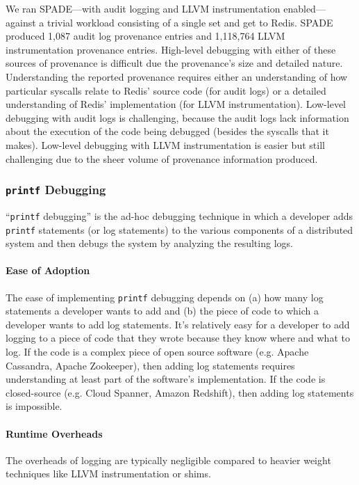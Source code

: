 We ran SPADE---with audit logging and LLVM instrumentation enabled---against a
trivial workload consisting of a single set and get to Redis. SPADE produced
1,087 audit log provenance entries and 1,118,764 LLVM instrumentation
provenance entries. High-level debugging with either of these sources of
provenance is difficult due the provenance's size and detailed nature.
Understanding the reported provenance requires either an understanding of how
particular syscalls relate to Redis' source code (for audit logs) or a detailed
understanding of Redis' implementation (for LLVM instrumentation). Low-level
debugging with audit logs is challenging, because the audit logs lack
information about the execution of the code being debugged (besides the
syscalls that it makes). Low-level debugging with LLVM instrumentation is easier
but still challenging due to the sheer volume of provenance information
produced.

\newcommand{\printf}{\texttt{printf}}
\subsubsection{\printf{} Debugging}
``\printf{} debugging'' is the ad-hoc debugging technique in which a developer
adds \printf{} statements (or log statements) to the various components of a
distributed system and then debugs the system by analyzing the resulting logs.

\paragraph{Ease of Adoption}
The ease of implementing \printf{} debugging depends on (a) how many log
statements a developer wants to add and (b) the piece of code to which a
developer wants to add log statements. It's relatively easy for a developer to
add logging to a piece of code that they wrote because they know where and what
to log. If the code is a complex piece of open source software (e.g. Apache
Cassandra, Apache Zookeeper), then adding log statements requires understanding
at least part of the software's implementation. If the code is closed-source
(e.g. Cloud Spanner, Amazon Redshift), then adding log statements is
impossible.

\paragraph{Runtime Overheads}
The overheads of logging are typically negligible compared to heavier weight
techniques like LLVM instrumentation or \fluent{} shims.

